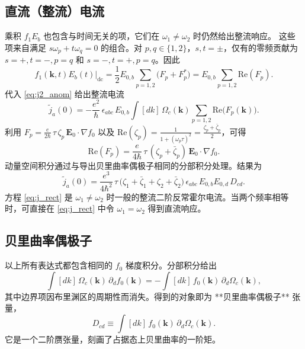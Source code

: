 \subsection{直流（整流）电流}

乘积 \(f_1E_b\) 也包含与时间无关的项，它们在 \(\omega_1\neq\omega_2\) 时仍然给出整流响应。  
这些项来自满足 \(s\omega_p+t\omega_q=0\) 的组合。对 \(p,q\in\{1,2\}\)，\(s,t=\pm\)，仅有的零频贡献为 \(s=+,t=-,p=q\) 和 \(s=-,t=+,p=q\)。因此
\[
f_1(\mathbf{k},t)E_b(t)\big|_{\text{dc}} = \frac12 E_{0,b}\sum_{p=1,2}\big(F_p+F_p^*\big)
= E_{0,b}\sum_{p=1,2}\mathrm{Re}(F_p).
\]
代入 \eqref{eq:j2_anom} 给出整流电流
\begin{equation}
\tilde j_a(0) = -\frac{e^2}{\hbar}\,\epsilon_{abc}\,E_{0,b}
\int [dk]\,\Omega_c(\mathbf{k})\sum_{p=1,2}\mathrm{Re}\big(F_p(\mathbf{k})\big).
\label{eq:j_dc_raw}
\end{equation}
利用 \(F_p = \frac{e}{2\hbar}\,\tau\,\zeta_p\,\mathbf{E}_0\!\cdot\!\nabla f_0\) 以及 \(\mathrm{Re}(\zeta_p) = \frac{1}{1+(\omega_p\tau)^2} = \frac{\zeta_p+\bar\zeta_p}{2}\)，可得
\begin{equation}
\mathrm{Re}(F_p) = \frac{e}{4\hbar}\,\tau\,(\zeta_p+\bar\zeta_p)\,\mathbf{E}_0\!\cdot\!\nabla f_0.
\end{equation}
动量空间积分通过与导出贝里曲率偶极子相同的分部积分处理。结果为
\begin{equation}
\tilde j_a(0) = \frac{e^3}{4\hbar^2}\,\tau\,
\big(\zeta_1+\bar\zeta_1+\zeta_2+\bar\zeta_2\big)\,
\epsilon_{abc}\,E_{0,b}E_{0,d}\,D_{cd}.
\label{eq:j_rect}
\end{equation}
方程 \eqref{eq:j_rect} 是 \(\omega_1\neq\omega_2\) 时一般的整流二阶反常霍尔电流。当两个频率相等时，可直接在 \eqref{eq:j_rect} 中令 \(\omega_1=\omega_2\) 得到直流响应。

\subsection{贝里曲率偶极子}

以上所有表达式都包含相同的 \(f_0\) 梯度积分。分部积分给出
\begin{equation}
\int [dk]\, \Omega_c(\mathbf{k})\, \partial_d f_0(\mathbf{k})
= -\int [dk]\, f_0(\mathbf{k})\, \partial_d\Omega_c(\mathbf{k}),
\end{equation}
其中边界项因布里渊区的周期性而消失。得到的对象即为 **贝里曲率偶极子** 张量，
\begin{equation}
D_{cd} \equiv \int [dk]\, f_0(\mathbf{k})\, \partial_d\Omega_c(\mathbf{k}).
\label{eq:dipole_def}
\end{equation}
它是一个二阶赝张量，刻画了占据态上贝里曲率的一阶矩。

